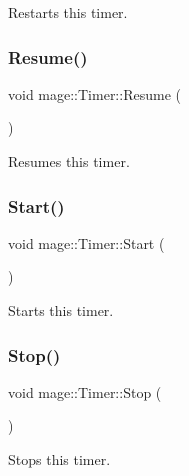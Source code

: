 Restarts this timer. \hypertarget{classmage_1_1_timer_ab3cfad4fd61d52852181f7a060069892}{}\label{classmage_1_1_timer_ab3cfad4fd61d52852181f7a060069892} 
\subsubsection{\texorpdfstring{Resume()}{Resume()}}
{\footnotesize\ttfamily void mage\+::\+Timer\+::\+Resume (\begin{DoxyParamCaption}{ }\end{DoxyParamCaption})\hspace{0.3cm}{\ttfamily [noexcept]}}

Resumes this timer. \hypertarget{classmage_1_1_timer_a60e9e329f1e71a6e25351ff6dbcc1b92}{}\label{classmage_1_1_timer_a60e9e329f1e71a6e25351ff6dbcc1b92} 
\subsubsection{\texorpdfstring{Start()}{Start()}}
{\footnotesize\ttfamily void mage\+::\+Timer\+::\+Start (\begin{DoxyParamCaption}{ }\end{DoxyParamCaption})\hspace{0.3cm}{\ttfamily [noexcept]}}

Starts this timer. \hypertarget{classmage_1_1_timer_aa880e02bfeea2d082a5f34e497bd6500}{}\label{classmage_1_1_timer_aa880e02bfeea2d082a5f34e497bd6500} 
\subsubsection{\texorpdfstring{Stop()}{Stop()}}
{\footnotesize\ttfamily void mage\+::\+Timer\+::\+Stop (\begin{DoxyParamCaption}{ }\end{DoxyParamCaption})\hspace{0.3cm}{\ttfamily [noexcept]}}

Stops this timer. \hypertarget{classmage_1_1_timer_a10f12ad8645e8022a09067f1393c065b}{}\label{classmage_1_1_timer_a10f12ad8645e8022a09067f1393c065b} 
